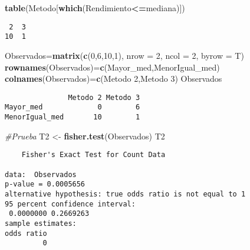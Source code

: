 \documentclass[
  a4paper,
  oneside,
  openany]{book}
\newenvironment{Shaded}{\begin{snugshade}}{\end{snugshade}}
\newcommand{\CommentTok}[1]{\textcolor[rgb]{0.56,0.35,0.01}{\textit{#1}}}
\newcommand{\DataTypeTok}[1]{\textcolor[rgb]{0.13,0.29,0.53}{#1}}
\newcommand{\DecValTok}[1]{\textcolor[rgb]{0.00,0.00,0.81}{#1}}
\newcommand{\KeywordTok}[1]{\textcolor[rgb]{0.13,0.29,0.53}{\textbf{#1}}}
\newcommand{\NormalTok}[1]{#1}
\newcommand{\OperatorTok}[1]{\textcolor[rgb]{0.81,0.36,0.00}{\textbf{#1}}}
\newcommand{\StringTok}[1]{\textcolor[rgb]{0.31,0.60,0.02}{#1}}
\begin{document}
\begin{Shaded}
\begin{Highlighting}[]
\KeywordTok{table}\NormalTok{(Metodo[}\KeywordTok{which}\NormalTok{(Rendimiento}\OperatorTok{\textless{}=}\NormalTok{mediana)])}
\end{Highlighting}
\end{Shaded}

\begin{verbatim}
 2  3 
10  1 
\end{verbatim}

\begin{Shaded}
\begin{Highlighting}[]
\NormalTok{Observados=}\KeywordTok{matrix}\NormalTok{(}\KeywordTok{c}\NormalTok{(}\DecValTok{0}\NormalTok{,}\DecValTok{6}\NormalTok{,}\DecValTok{10}\NormalTok{,}\DecValTok{1}\NormalTok{), }\DataTypeTok{nrow =} \DecValTok{2}\NormalTok{, }\DataTypeTok{ncol =} \DecValTok{2}\NormalTok{, }\DataTypeTok{byrow =}\NormalTok{ T)}
\KeywordTok{rownames}\NormalTok{(Observados)=}\KeywordTok{c}\NormalTok{(}\StringTok{\textquotesingle{}Mayor\_med\textquotesingle{}}\NormalTok{,}\StringTok{\textquotesingle{}MenorIgual\_med\textquotesingle{}}\NormalTok{)}
\KeywordTok{colnames}\NormalTok{(Observados)=}\KeywordTok{c}\NormalTok{(}\StringTok{\textquotesingle{}Metodo 2\textquotesingle{}}\NormalTok{,}\StringTok{\textquotesingle{}Metodo 3\textquotesingle{}}\NormalTok{)}
\NormalTok{Observados}
\end{Highlighting}
\end{Shaded}

\begin{verbatim}
               Metodo 2 Metodo 3
Mayor_med             0        6
MenorIgual_med       10        1
\end{verbatim}

\begin{Shaded}
\begin{Highlighting}[]
\CommentTok{\#Prueba}
\NormalTok{T2 \textless{}{-}}\StringTok{ }\KeywordTok{fisher.test}\NormalTok{(Observados)}
\NormalTok{T2}
\end{Highlighting}
\end{Shaded}

\begin{verbatim}
    Fisher's Exact Test for Count Data

data:  Observados
p-value = 0.0005656
alternative hypothesis: true odds ratio is not equal to 1
95 percent confidence interval:
 0.0000000 0.2669263
sample estimates:
odds ratio 
         0 
\end{verbatim}
\end{document}
